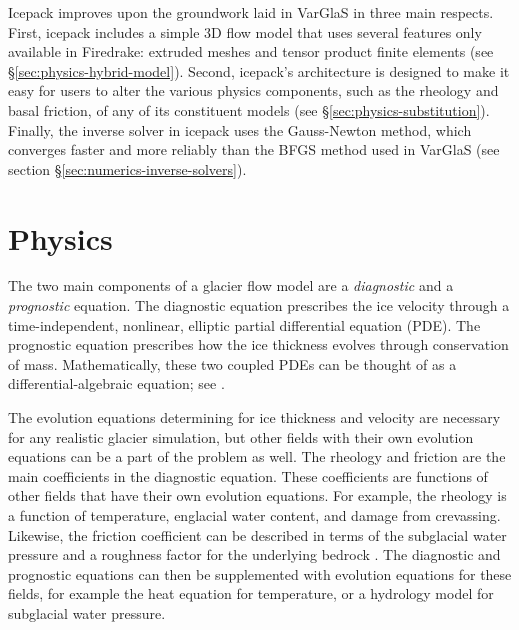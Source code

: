 \documentclass[journal abbreviation, manuscript]{copernicus}
\begin{document}
Icepack improves upon the groundwork laid in VarGlaS in three main respects.
First, icepack includes a simple 3D flow model that uses several features only available in Firedrake: extruded meshes and tensor product finite elements \citep{bercea2016structure, mcrae2016automated} (see \S\ref{sec:physics-hybrid-model}).
Second, icepack's architecture is designed to make it easy for users to alter the various physics components, such as the rheology and basal friction, of any of its constituent models (see \S\ref{sec:physics-substitution}).
Finally, the inverse solver in icepack uses the Gauss-Newton method, which converges faster and more reliably than the BFGS method used in VarGlaS (see section \S\ref{sec:numerics-inverse-solvers}).


\section{Physics}

The two main components of a glacier flow model are a \emph{diagnostic} and a \emph{prognostic} equation.
The diagnostic equation prescribes the ice velocity through a time-independent, nonlinear, elliptic partial differential equation (PDE).
The prognostic equation prescribes how the ice thickness evolves through conservation of mass.
Mathematically, these two coupled PDEs can be thought of as a differential-algebraic equation; see \citet{ascher1998computer}.

The evolution equations determining for ice thickness and velocity are necessary for any realistic glacier simulation, but other fields with their own evolution equations can be a part of the problem as well.
The rheology and friction are the main coefficients in the diagnostic equation.
These coefficients are functions of other fields that have their own evolution equations.
For example, the rheology is a function of temperature, englacial water content, and damage from crevassing.
Likewise, the friction coefficient can be described in terms of the subglacial water pressure and a roughness factor for the underlying bedrock \citep{cuffey2010physics}.
The diagnostic and prognostic equations can then be supplemented with evolution equations for these fields, for example the heat equation for temperature, or a hydrology model for subglacial water pressure.
\end{document}
